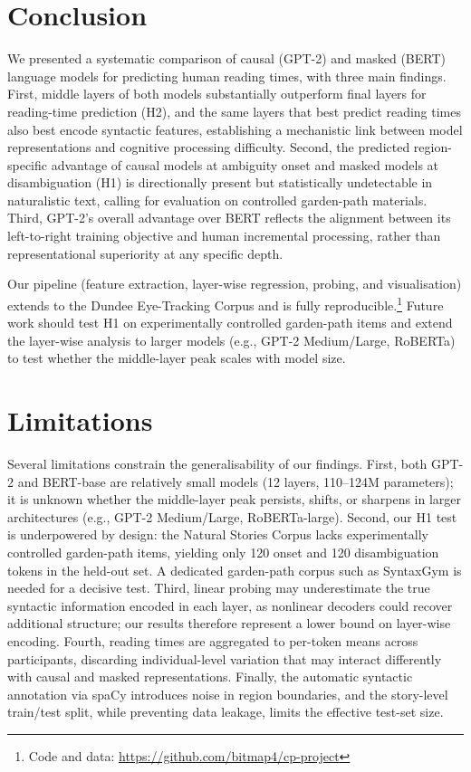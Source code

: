 \documentclass[11pt]{article}
\begin{document}
\section{Conclusion}

We presented a systematic comparison of causal (GPT-2) and masked (BERT) language models for predicting human reading times, with three main findings.
First, middle layers of both models substantially outperform final layers for reading-time prediction (H2), and the same layers that best predict reading times also best encode syntactic features, establishing a mechanistic link between model representations and cognitive processing difficulty.
Second, the predicted region-specific advantage of causal models at ambiguity onset and masked models at disambiguation (H1) is directionally present but statistically undetectable in naturalistic text, calling for evaluation on controlled garden-path materials.
Third, GPT-2's overall advantage over BERT reflects the alignment between its left-to-right training objective and human incremental processing, rather than representational superiority at any specific depth.

Our pipeline (feature extraction, layer-wise regression, probing, and visualisation) extends to the Dundee Eye-Tracking Corpus and is fully reproducible.\footnote{Code and data: \url{https://github.com/bitmap4/cp-project}}
Future work should test H1 on experimentally controlled garden-path items and extend the layer-wise analysis to larger models (e.g., GPT-2 Medium/Large, RoBERTa) to test whether the middle-layer peak scales with model size.

\section*{Limitations}

Several limitations constrain the generalisability of our findings.
First, both GPT-2 and BERT-base are relatively small models (12 layers, 110--124M parameters); it is unknown whether the middle-layer peak persists, shifts, or sharpens in larger architectures (e.g., GPT-2 Medium/Large, RoBERTa-large).
Second, our H1 test is underpowered by design: the Natural Stories Corpus lacks experimentally controlled garden-path items, yielding only 120 onset and 120 disambiguation tokens in the held-out set.
A dedicated garden-path corpus such as SyntaxGym \citep{gauthier2020} is needed for a decisive test.
Third, linear probing may underestimate the true syntactic information encoded in each layer, as nonlinear decoders could recover additional structure; our results therefore represent a lower bound on layer-wise encoding.
Fourth, reading times are aggregated to per-token means across participants, discarding individual-level variation that may interact differently with causal and masked representations.
Finally, the automatic syntactic annotation via spaCy introduces noise in region boundaries, and the story-level train/test split, while preventing data leakage, limits the effective test-set size.
\end{document}
